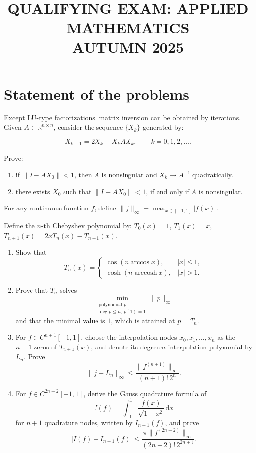 \documentclass[11pt,a4paper]{article}
\title{\textbf{QUALIFYING EXAM: APPLIED MATHEMATICS}\\[0.5em]\Large AUTUMN 2025}
\date{}
\author{}
\newcommand{\examstatement}[1]{%
  \par\addvspace{0.85em}%
  \noindent{\bfseries #1}\par\nobreak\addvspace{0.28em}%
}
\begin{document}
\maketitle
\vspace{-3em}

\tableofcontents

\section{Statement of the problems}

\examstatement{Problem 1. [10 points]}
Except LU-type factorizations, matrix inversion can be obtained by iterations. Given \(A \in \mathbb{R}^{n \times n}\), consider the sequence \(\{X_{k}\}\) generated by:

\[
X_{k+1} = 2X_{k} - X_{k} A X_{k}, \qquad k = 0, 1, 2, \dots.
\]

Prove:
\begin{enumerate}[label=(\alph*)]
    \item if \(\|I - A X_{0}\| < 1\), then \(A\) is nonsingular and \(X_{k} \to A^{-1}\) quadratically.
    \item there exists \(X_{0}\) such that \(\|I - A X_{0}\| < 1\), if and only if \(A\) is nonsingular.
\end{enumerate}

\examstatement{Problem 2. [20 points]}
For any continuous function \(f\), define \(\|f\|_{\infty} = \max_{x \in [-1,1]} |f(x)|\).

Define the \(n\)-th Chebyshev polynomial by: \(T_{0}(x) = 1\), \(T_{1}(x) = x\), \(T_{n+1}(x) = 2x T_{n}(x) - T_{n-1}(x)\).
\begin{enumerate}[label=(\alph*)]
    \item Show that
    \[
    T_{n}(x) =
    \begin{cases}
    \cos(n \arccos x), & |x| \le 1, \\
    \cosh(n \operatorname{arccosh} x), & |x| > 1.
    \end{cases}
    \]
    \item Prove that \(T_{n}\) solves
    \[
    \min_{\substack{\text{polynomial }p\\ \deg p\le n,\, p(1)=1}}\|p\|_{\infty}
    \]
    and that the minimal value is \(1\), which is attained at \(p = T_{n}\).
    \item For \(f \in C^{n+1}[-1,1]\), choose the interpolation nodes \(x_{0}, x_{1}, \ldots, x_{n}\) as the \(n+1\) zeros of \(T_{n+1}(x)\), and denote its degree-\(n\) interpolation polynomial by \(L_{n}\). Prove
    \[
    \|f - L_{n}\|_{\infty} \le \frac{\|f^{(n+1)}\|_{\infty}}{(n+1)!\, 2^{n}}.
    \]
    \item For \(f \in C^{2n+2}[-1,1]\), derive the Gauss quadrature formula of
    \[
    I(f) = \int_{-1}^{1} \frac{f(x)}{\sqrt{1-x^{2}}}\,\mathrm{d}x
    \]
    for \(n+1\) quadrature nodes, written by \(I_{n+1}(f)\), and prove
    \[
    \bigl|I(f) - I_{n+1}(f)\bigr| \le \frac{\pi \|f^{(2n+2)}\|_{\infty}}{(2n+2)!\, 2^{2n+1}}.
    \]
\end{enumerate}
\end{document}
